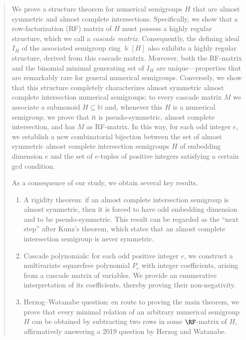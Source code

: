 \documentclass[11pt,twoside]{amsart}
\newcommand{\N}{\mathbb N}
\theoremstyle{definition}
\numberwithin{equation}{section}
\begin{document}
\begin{abstract} 
We prove a structure theorem for numerical semigroups $H$ that are almost symmetric and almost complete intersections. 
Specifically, we show that a row-factorization (RF) matrix of $H$ must possess a highly regular structure, 
which we call a \emph{cascade matrix}.
Consequently,  the defining ideal $I_H$ 
 of the associated semigroup ring $\Bbbk[H]$ also exhibits 
a highly regular structure, derived from this cascade matrix.
Moreover, both the RF-matrix and the binomial minimal generating set of $I_H$ are unique---properties that are remarkably rare for general numerical semigroups.
Conversely, 
we show that this structure completely characterizes almost symmetric almost complete intersection numerical semigroups: 
to every cascade matrix $M$ we associate a submonoid $H \subseteq \N$ and, whenever
this $H$ is a numerical semigroup, we prove that it is  pseudo-symmetric, almost complete intersection, and has $M$ as RF-matrix.
In this way, for each odd integer $e$,
we establish a new combinatorial bijection between
the set of 
almost symmetric almost complete intersection  semigroups $H$ 
of embedding dimension $e$ and 
the set of  $e$-tuples of positive integers satisfying a certain gcd condition.

As a consequence of our study, we obtain several key  results.
\begin{enumerate}
    \item A rigidity theorem: 
    if an almost complete intersection  semigroup is almost symmetric, then  it is forced to have odd embedding dimension and to be pseudo-symmetric.
This result can be regarded
as the ``next step'' after Kunz's theorem, which states that  an almost complete intersection semigroup is never symmetric.
 \item Cascade polynomials: for each odd positive integer $e$, we construct a multivariate squarefree polynomial $P_e$ with integer coefficients, arising from a cascade matrix of variables. We provide an enumerative interpretation of its coefficients, thereby proving their non-negativity.
 
 \item Herzog--Watanabe question:
  en route to proving  the main theorem,  we prove that
 every  minimal relation of an arbitrary numerical semigroup $H$
 can be obtained by subtracting two rows in some $\RF$-matrix of $H$,
 affirmatively answering a 2019 question by Herzog and Watanabe.
\end{enumerate}

\end{abstract}
\end{document}
